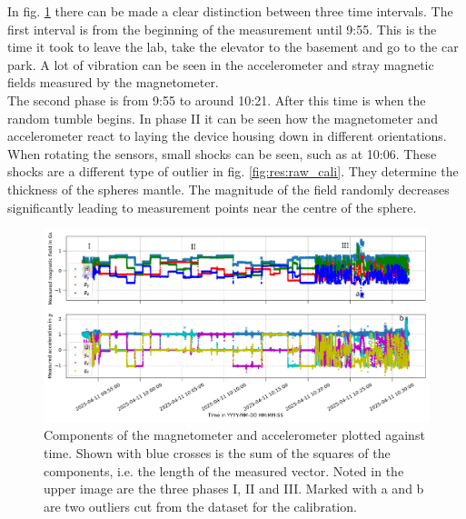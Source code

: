 In fig. \ref{fig:res:raw_cali_vectors} there can be made a clear distinction between three time intervals. The first interval is from the beginning of the measurement until 9:55. This is the time it took to leave the lab, take the elevator to the basement and go to the car park. A lot of vibration can be seen in the accelerometer and stray magnetic fields measured by the magnetometer.\\
The second phase is from 9:55 to around 10:21. After this time is when the random tumble begins. In phase II it can be seen how the magnetometer and accelerometer react to laying the device housing down in different orientations. When rotating the sensors, small shocks can be seen, such as at 10:06. These shocks are a different type of outlier in fig. \ref{fig:res:raw_cali}. They determine the thickness of the spheres mantle. The magnitude of the field randomly decreases significantly leading to measurement points near the centre of the sphere.

\begin{figure}[H]
    \centering
    \includegraphics[width=\linewidth]{images/04_results/raw_vectors-2025-04-11.png}
    \caption[Components of the magnetometer and accelerometer plotted against time.]{Components of the magnetometer and accelerometer plotted against time. Shown with blue crosses is the sum of the squares of the components, i.e. the length of the measured vector. Noted in the upper image are the three phases I, II and III. Marked with a and b are two outliers cut from the dataset for the calibration.}
    \label{fig:res:raw_cali_vectors}
\end{figure}

